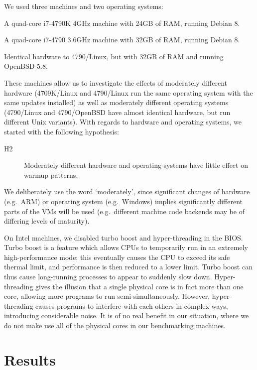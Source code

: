 \documentclass[10pt,preprint]{sigplanconf}
\newcommand{\hyptwo}{H2\xspace}
\newcommand{\bencherthree}{4709K/Linux\xspace}
\newcommand{\bencherfive}{4790/Linux\xspace}
\newcommand{\benchersix}{4790/OpenBSD\xspace}
\begin{document}
We used three machines and two operating systems:
\begin{description*}
  \item[\bencherthree] A quad-core i7-4790K 4GHz machine with 24GB of RAM, running Debian 8.
  \item[\bencherfive] A quad-core i7-4790 3.6GHz machine with 32GB of RAM, running Debian 8.
  \item[\benchersix] Identical hardware to \bencherfive, but with 32GB of RAM and running OpenBSD 5.8.
\end{description*}
These machines allow us to investigate the effects of moderately different
hardware (\bencherthree and \bencherfive run the same operating system with the
same updates installed) as well as moderately different operating systems
(\bencherfive and \benchersix have almost identical hardware, but run different
Unix
variants). With regards to hardware and operating systems, we started with the
following hypothesis:
\begin{description}
  \item[\hyptwo] Moderately different hardware and operating systems have little effect on warmup patterns.
\end{description}
We deliberately use the word `moderately', since significant changes of hardware
(e.g.~ARM) or operating system (e.g.~Windows) implies significantly different
parts of the VMs will be used (e.g.~different machine code backends may be of
differing levels of maturity).

On Intel machines, we disabled turbo boost and hyper-threading in the BIOS. Turbo boost is a
feature which allows CPUs to temporarily run in an extremely high-performance
mode; this eventually causes the CPU to exceed its safe thermal limit, and
performance is then reduced to a lower limit. Turbo boost can thus cause long-running processes to
appear to suddenly slow down. Hyper-threading gives the illusion that a single
physical core is in fact more than one core, allowing more programs to
run semi-simultaneously. However, hyper-threading causes programs to interfere
with each others in complex ways, introducing considerable noise. It
is of no real benefit in our situation, where we do not make use all of the
physical cores in our benchmarking machines.

\section{Results}
\label{sec:Results}
\end{document}
